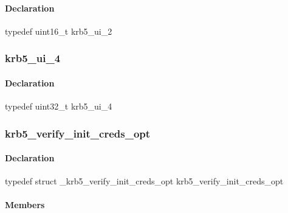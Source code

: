 \documentclass[letterpaper,10pt,english]{sphinxmanual}
\begin{document}
\paragraph{Declaration}
\label{appdev/refs/types/krb5_ui_2:declaration}
typedef uint16\_t krb5\_ui\_2


\subsubsection{krb5\_ui\_4}
\label{appdev/refs/types/krb5_ui_4:krb5-ui-4}\label{appdev/refs/types/krb5_ui_4:krb5-ui-4-struct}\label{appdev/refs/types/krb5_ui_4::doc}

\begin{fulllineitems}
\label{appdev/refs/types/krb5_ui_4:c.krb5_ui_4}
\end{fulllineitems}



\paragraph{Declaration}
\label{appdev/refs/types/krb5_ui_4:declaration}
typedef uint32\_t krb5\_ui\_4


\subsubsection{krb5\_verify\_init\_creds\_opt}
\label{appdev/refs/types/krb5_verify_init_creds_opt:krb5-verify-init-creds-opt-struct}\label{appdev/refs/types/krb5_verify_init_creds_opt::doc}\label{appdev/refs/types/krb5_verify_init_creds_opt:krb5-verify-init-creds-opt}

\begin{fulllineitems}
\label{appdev/refs/types/krb5_verify_init_creds_opt:c.krb5_verify_init_creds_opt}
\end{fulllineitems}



\paragraph{Declaration}
\label{appdev/refs/types/krb5_verify_init_creds_opt:declaration}
typedef struct \_krb5\_verify\_init\_creds\_opt  krb5\_verify\_init\_creds\_opt


\paragraph{Members}
\label{appdev/refs/types/krb5_verify_init_creds_opt:members}
\end{document}

